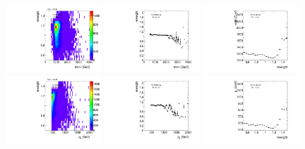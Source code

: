 \begin{figure}[htbp!]
\begin{center}
\includegraphics[angle=270, width=0.32\textwidth]{./figures/boosted/AppendixReweight/Weights/2Trk_split_Signal_mHH_l_weight.pdf}
\includegraphics[angle=270, width=0.32\textwidth]{./figures/boosted/AppendixReweight/Weights/2Trk_split_Signal_mHH_l_weight_profx.pdf}
\includegraphics[angle=270, width=0.32\textwidth]{./figures/boosted/AppendixReweight/Weights/2Trk_split_Signal_mHH_l_weight_profy.pdf}\\
\includegraphics[angle=270, width=0.32\textwidth]{./figures/boosted/AppendixReweight/Weights/2Trk_split_Signal_leadHCand_Pt_m_weight.pdf}
\includegraphics[angle=270, width=0.32\textwidth]{./figures/boosted/AppendixReweight/Weights/2Trk_split_Signal_leadHCand_Pt_m_weight_profx.pdf}
\includegraphics[angle=270, width=0.32\textwidth]{./figures/boosted/AppendixReweight/Weights/2Trk_split_Signal_leadHCand_Pt_m_weight_profy.pdf}\\

\end{center}
\end{figure}
